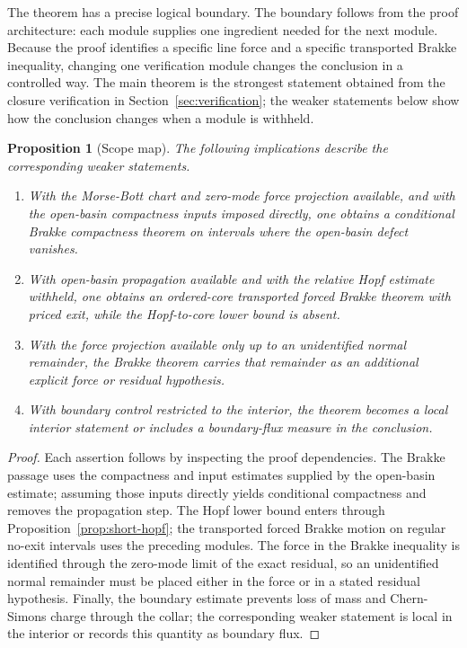 \documentclass[11pt]{article}
\newtheorem{proposition}[theorem]{Proposition}
\theoremstyle{definition}
\begin{document}
The theorem has a precise logical boundary.  The boundary follows from the
proof architecture: each module supplies one ingredient needed for the next
module.  Because the proof identifies a specific line force and a specific
transported Brakke inequality, changing one verification module changes the
conclusion in a controlled way.  The main theorem is the strongest statement
obtained from the closure verification in Section~\ref{sec:verification}; the
weaker statements below show how the conclusion changes when a module is
withheld.

\begin{proposition}[Scope map]
\label{prop:downgrade-map}
The following implications describe the corresponding weaker statements.
\begin{enumerate}[label=(\roman*)]
\item With the Morse-Bott chart and zero-mode force projection available, and
with the open-basin compactness inputs imposed directly, one obtains a
conditional Brakke compactness theorem on intervals where the open-basin defect
vanishes.
\item With open-basin propagation available and with the relative Hopf estimate
withheld, one obtains an ordered-core transported forced Brakke theorem with
priced exit, while the Hopf-to-core lower bound is absent.
\item With the force projection available only up to an unidentified normal
remainder, the Brakke theorem carries that remainder as an additional explicit
force or residual hypothesis.
\item With boundary control restricted to the interior, the theorem becomes a
local interior statement or includes a boundary-flux measure in the conclusion.
\end{enumerate}
\end{proposition}

\begin{proof}
Each assertion follows by inspecting the proof dependencies.  The Brakke
passage uses the compactness and input estimates supplied by the open-basin
estimate; assuming those inputs directly yields conditional compactness and
removes the propagation step.  The Hopf lower bound enters through
Proposition~\ref{prop:short-hopf}; the transported forced Brakke motion on
regular no-exit intervals uses the preceding modules.  The force in the Brakke
inequality is identified through the zero-mode limit of the exact residual, so
an unidentified normal remainder must be placed either in the force or in a
stated residual hypothesis.  Finally, the boundary estimate prevents loss of
mass and Chern-Simons charge through the collar; the corresponding weaker
statement is local in the interior or records this quantity as boundary flux.
\end{proof}
\end{document}

